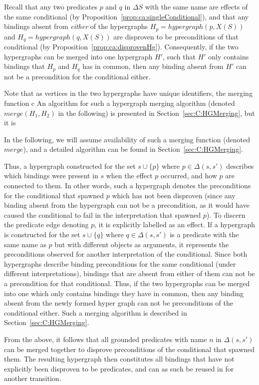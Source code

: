 \documentclass[../Master.tex]{subfiles}
\begin{document}
Recall that any two predicates $p$ and $q$ in $\Delta S$ with the same name are effects of the same conditional (by Proposition~\ref{prop:ca:singleConditional}), and that any bindings absent from \textit{either} of the hypergraphs $H_p = hypergraph(p, X(S))$ and $H_q = hypergraph(q, X(S))$ are disproven to be preconditions of that conditional (by Proposition~\ref{prop:ca:disprovenHg}). Consequently, if the two hypergraphs can be merged into one hypergraph $H'$, such that $H'$ only contains bindings that $H_p$ and $H_q$ has in common, then any binding absent from $H'$ can not be a precondition for the conditional either. 

Note that as vertices in the two hypergraphs have unique identifiers, the merging function c An algorithm for such a hypergraph merging algorithm (denoted $merge\left(H_1, H_2\right)$ in the following) is presented in Section~\ref{sec:C:HGMerging}, but it is 

In the following, we will assume availability of such a merging function (denoted $merge$), and a detailed algorithm can be found in Section~\ref{sec:C:HGMerging}.

Thus, a hypergraph constructed for the set $s \cup \{ p \}$ where $p \in \Delta \left(s, s' \right)$ describes which bindings were present in $s$ when the effect $p$ occurred, and how $p$ are connected to them. In other words, such a hypergraph denotes the preconditions for the conditional that spawned $p$ which has not been disproven (since any binding absent from the hypergraph can not be a precondition, as it would have caused the conditional to fail in the interpretation that spawned $p$). To discern the predicate edge denoting $p$, it is explicitly labelled as an effect. If a hypergraph is constructed for the set $s \cup \{ q \}$ where $q \in \Delta \left(s,s'\right)$ is a predicate with the same name as $p$ but with different objects as arguments, it represents the preconditions observed for another interpretation of the conditional. Since both hypergraphs describe binding preconditions for the same conditional (under different interpretations), bindings that are absent from either of them can not be a precondition for that conditional. Thus, if the two hypergraphs can be merged into one which only contains bindings they have in common, then any binding absent from the newly formed hyper graph can not be preconditions of the conditional either. Such a merging algorithm is described in Section~\ref{sec:C:HGMerging}.

From the above, it follows that all grounded predicates with name $n$ in $\Delta\left(s, s'\right)$ can be merged together to disprove preconditions of the conditional that spawned them. The resulting hypergraph then constitutes all bindings that have not explicitly been disproven to be predicates, and can as such be reused in for another transition.
\end{document}
